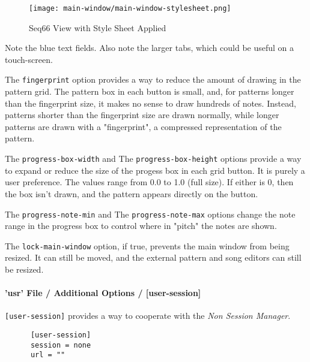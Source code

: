 \begin{figure}[H]
   \centering 
   \texttt{[image: main-window/main-window-stylesheet.png]}
   \caption{Seq66 View with Style Sheet Applied}
   \label{fig:view_with_style_sheet_applied}
\end{figure}

   Note the blue text fields. Also note the larger tabs, which could be useful on
   a touch-screen.

   The \texttt{fingerprint} option provides a way to reduce the amount of
   drawing in the pattern grid.  The pattern box in each button is small, and,
   for patterns longer than the fingerprint size, it makes no sense to draw
   hundreds of notes.  Instead, patterns shorter than the fingerprint size are
   drawn normally, while longer patterns are drawn with a "fingerprint", a
   compressed representation of the pattern.

   The \texttt{progress-box-width} and
   The \texttt{progress-box-height} options provide a way to expand or reduce
   the size of the progess box in each grid button.
   It is purely a user preference.
   The values range from 0.0 to 1.0 (full size).  If either is 0,
   then the box isn't drawn, and the pattern appears directly on the button.

   The \texttt{progress-note-min} and
   The \texttt{progress-note-max} options change the note range in the progress
   box to control where in "pitch" the notes are shown.

   The \texttt{lock-main-window} option, if true, prevents the main window from
   being resized.  It can still be moved, and the external pattern and song
   editors can still be resized.

\paragraph{'usr' File / Additional Options / [user-session]}
\label{paragraph:user_file_added_options_session}

   \texttt{[user-session]} provides a way to cooperate with the
   \textsl{Non Session Manager}.

   \begin{verbatim}
      [user-session]
      session = none
      url = ""
   \end{verbatim}

